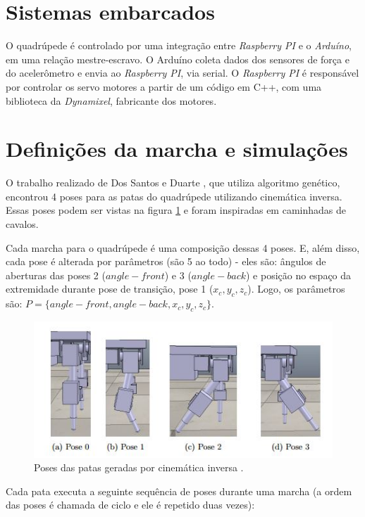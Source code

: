 \documentclass[12pt]{report}
\begin{document}
\section*{Sistemas embarcados}

O quadrúpede é controlado por uma integração entre \textit{Raspberry PI} e o \textit{Arduíno}, em uma relação mestre-escravo. O Arduíno coleta dados dos sensores de força e do acelerômetro e envia ao \textit{Raspberry PI}, via serial. O \textit{Raspberry PI} é responsável por controlar os servo motores a partir de um código em C++, com uma biblioteca da \textit{Dynamixel}, fabricante dos motores.

\section*{Definições da marcha e simulações}

O trabalho realizado de Dos Santos e Duarte \cite{2}, que utiliza algoritmo genético, encontrou 4 poses para as patas do quadrúpede utilizando cinemática inversa. Essas poses podem ser vistas na figura \ref{poses} e foram inspiradas em caminhadas de cavalos. 

Cada marcha para o quadrúpede é uma composição dessas 4 poses. E, além disso, cada pose é alterada por parâmetros (são 5 ao todo) - eles são: ângulos de aberturas das poses 2 ($angle-front$) e 3 ($angle-back$) e posição no espaço da extremidade durante pose de transição, pose 1 ($x_c, y_c, z_c$). Logo, os parâmetros são: $P=\{angle-front, angle-back, x_c, y_c, z_c\}$. 

\begin{figure}[h!]
\centering
\includegraphics[scale=1]{imagens/fundamentos/poses.JPG}
\caption{Poses das patas geradas por cinemática inversa \cite{2}.}
\label{poses}
\end{figure}

Cada pata executa a seguinte sequência de poses durante uma marcha (a ordem das poses é chamada de ciclo e ele é repetido duas vezes):
\end{document}
